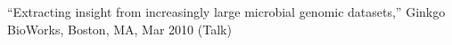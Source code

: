 \documentclass[overlapped,line,11pt]{res}
\newenvironment{list2}{
  \begin{list}{$\bullet$}{%
      \setlength{\itemsep}{0in}
      \setlength{\parsep}{0in} \setlength{\parskip}{0in}
      \setlength{\topsep}{0in} \setlength{\partopsep}{0in} 
      \setlength{\leftmargin}{0.2in}}}{\end{list}}
\begin{document}
\begin{resume}
\begin{revnumerate}[28]
\item {``Extracting insight from increasingly large microbial genomic
  datasets,'' Ginkgo BioWorks, Boston, MA, Mar 2010 (Talk)}
\vspace*{0mm}

\end{revnumerate}




\end{resume}
\end{document}
